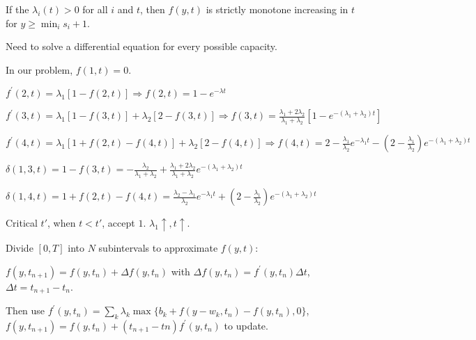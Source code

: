 If the $\lambda_{i}(t) > 0$ for all $i$ and $t$, then $f(y,t)$ is strictly monotone increasing in $t$ for $y \geq \min_{i} s_i +1$.

Need to solve a differential equation for every possible capacity.

In our problem, $f(1,t) = 0$.

$f^{\prime}(2, t) = \lambda_1 [1- f(2,t)] \Rightarrow f(2,t) = 1- e^{-\lambda t}$

$f^{\prime}(3, t) = \lambda_1 [1- f(3,t)] + \lambda_2 [2 - f(3,t)] \Rightarrow f(3,t) = \frac{\lambda_1 + 2 \lambda_2}{\lambda_1 + \lambda_2} [1- e^{-(\lambda_1 + \lambda_2) t}]$

$f^{\prime}(4, t) = \lambda_1 [1 + f(2,t) - f(4,t)] + \lambda_2 [2 - f(4,t)] \Rightarrow f(4,t) = 2- \frac{\lambda_1}{\lambda_2} e^{-\lambda_1 t} - (2- \frac{\lambda_1}{\lambda_2}) e^{-(\lambda_1 + \lambda_2)t}$

$\delta(1,3,t) = 1- f(3,t) = - \frac{\lambda_2}{\lambda_1 + \lambda_2} + \frac{\lambda_1 + 2 \lambda_2}{\lambda_1 + \lambda_2} e^{-(\lambda_1 + \lambda_2)t}$

$\delta(1,4,t) = 1+ f(2,t) - f(4,t) = \frac{\lambda_2- \lambda_1}{\lambda_2} e^{-\lambda_1 t} + (2- \frac{\lambda_1}{\lambda_2}) e^{-(\lambda_1 + \lambda_2)t}$

Critical $t{'}$, when $t < t{'}$, accept $1$.  $\lambda_1 \uparrow, t \uparrow$.

Divide $[0, T]$ into $N$ subintervals to approximate $f(y,t)$:

$f(y,t_{n+1}) = f(y, t_n) + \Delta f(y, t_n)$ with $\Delta f(y, t_n) = f^{'}(y, t_n) \Delta t$, $\Delta t = t_{n+1} - t_{n}$.

Then use $f^{\prime} (y, t_n) = \sum_k \lambda_k \max\{b_k + f(y-w_k, t_n)- f(y, t_n), 0\}$, $f(y, t_{n+1}) = f(y, t_n) + (t_{n+1} - t{n}) f^{\prime}(y, t_n)$ to update.